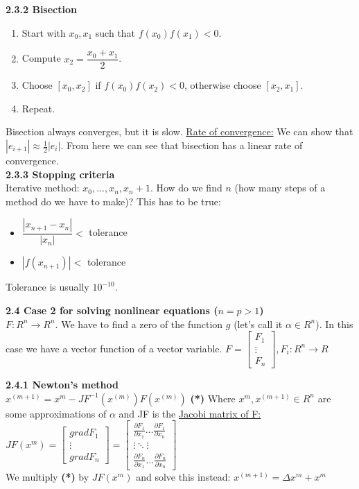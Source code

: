 \documentclass{article}
\begin{document}
\begin{multicols}{2}
\textbf{2.3.2 Bisection}
\begin{enumerate}
  \item Start with $x_0, x_1$ such that $f(x_0)f(x_1) < 0$.
  \item Compute $x_2 = \dfrac{x_0 + x_1}{2}$.
  \item Choose $[x_0, x_2]$ if $f(x_0)f(x_2) < 0$, otherwise choose $[x_2, x_1]$.
  \item Repeat.
\end{enumerate}
Bisection always converges, but it is slow.
\underline{Rate of convergence:}
We can show that $|e_{i+1}| \approx \frac{1}{2}|e_i|$. From here we can see that bisection has
a linear rate of convergence.\\

\textbf{2.3.3 Stopping criteria}\\
Iterative method: $x_0,..., x_n, x_n+1$. How do we find $n$ (how many steps of a method
do we have to make)? This has to be true:
\begin{itemize}
  \item $\dfrac{|x_{n+1} - x_n|}{|x_n|} <$ tolerance
  \item $|f(x_{n+1})|<$ tolerance
\end{itemize}
Tolerance is usually $10^{-10}$.

\textbf{2.4 Case 2 for solving nonlinear equations ($n = p > 1$)}\\
$F: R^n \rightarrow R^n$. We have to find a zero of the function $g$ (let's call it $\alpha \in R^n$).
In this case we have a vector function of a vector variable.
$F =
\begin{bmatrix}
F_1\\
\vdots\\
F_n
\end{bmatrix}
, F_i: R^n \rightarrow R$

\textbf{2.4.1 Newton's method}\\
$x^{(m+1)} = x^{m} - JF^{-1}(x^{(m)})F(x^{(m)})$ \textbf{(*)}
Where $x^{m}, x^{(m+1)} \in R^n$ are some approximations of $\alpha$
and JF is the \underline{Jacobi matrix of F:} $JF(x^{m}) = 
  \begin{bmatrix}
  grad F_1\\
  \vdots \\
  grad F_n
  \end{bmatrix}
=
  \begin{bmatrix}
  \frac{\partial F_1}{\partial x_1} \dots \frac{\partial F_1}{\partial x_n}\\
  \vdots \ddots \vdots \\
  \frac{\partial F_n}{\partial x_1} \dots \frac{\partial F_n}{\partial x_n}  
  \end{bmatrix}
$ \\
We multiply \textbf{(*)} by $JF(x^{m})$ and solve this instead:
$x^{(m+1)} = \Delta x^{m} + x^{m}$


\end{multicols}
\end{document}
